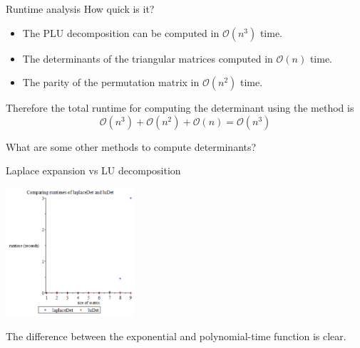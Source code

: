 \documentclass{beamer}
\begin{document}
\begin{frame}{Runtime analysis}
    How quick is it?
    \begin{itemize}
        \item The PLU decomposition can be computed in $\mathcal{O}(n^3)$ time.
        \item The determinants of the triangular matrices computed in $\mathcal{O}(n)$ time.
        \item The parity of the permutation matrix in $\mathcal{O}(n^2)$ time.
    \end{itemize}

    Therefore the total runtime for computing the determinant using the method is
    \[
        \mathcal{O}(n^3) + \mathcal{O}(n^2) + \mathcal{O}(n) = \mathcal{O}(n^3)
    \]

    \begin{exampleblock}{}
        What are some other methods to compute determinants?
    \end{exampleblock}

\end{frame}


\begin{frame}{Laplace expansion vs LU decomposition}

    \begin{center}{}
        \includegraphics[height=180]{laplace-lu}
    \end{center}

    The difference between the exponential and polynomial-time function is clear.
\end{frame}
\end{document}
